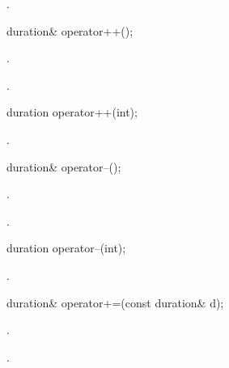 \begin{itemdescr}
\pnum
\returns {}.
\end{itemdescr}

%
%
\begin{itemdecl}
duration& operator++();
\end{itemdecl}

\begin{itemdescr}
\pnum
\effects {}.

\pnum
\returns {}.
\end{itemdescr}

%
%
\begin{itemdecl}
duration operator++(int);
\end{itemdecl}

\begin{itemdescr}
\pnum
\returns {}.
\end{itemdescr}

%
%
\begin{itemdecl}
duration& operator--();
\end{itemdecl}

\begin{itemdescr}
\pnum
\effects {}.

\pnum
\returns {}.
\end{itemdescr}

%
%
\begin{itemdecl}
duration operator--(int);
\end{itemdecl}

\begin{itemdescr}
\pnum
\returns {}.
\end{itemdescr}

%
%
\begin{itemdecl}
duration& operator+=(const duration& d);
\end{itemdecl}

\begin{itemdescr}
\pnum
\effects {}.

\pnum
\returns {}.
\end{itemdescr}

